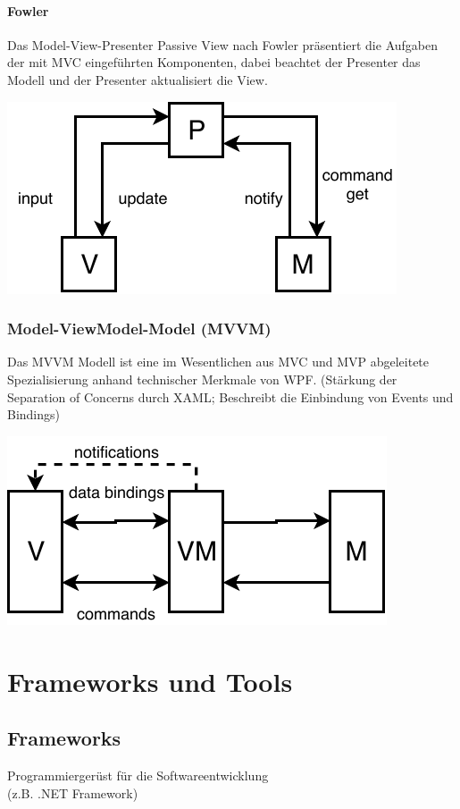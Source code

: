 \documentclass
[
	8pt,		%
	ngerman,	%
	a4paper,	%
	landscape,	%
	final		%
]{extarticle}
\begin{document}
\begin{multicols*}{4}
	\paragraph{Fowler}
	Das Model-View-Presenter Passive View nach Fowler präsentiert die Aufgaben
	der mit MVC eingeführten Komponenten, dabei beachtet der Presenter das Modell
	und der Presenter aktualisiert die View.
	\begin{center}
		\includegraphics[width=0.8\linewidth]{./Documents/Graphics/DiagramMVPFowler.pdf}
	\end{center}
	\subsubsection{Model-ViewModel-Model (MVVM)}
	Das MVVM Modell ist eine im Wesentlichen aus MVC und MVP abgeleitete
	Spezialisierung anhand technischer Merkmale von WPF.
	(Stärkung der Separation of Concerns durch XAML; Beschreibt die Einbindung
	von Events und Bindings)
	\begin{center}
		\includegraphics[width=0.8\linewidth]{./Documents/Graphics/DiagramMVVM.pdf}
	\end{center}
	\section{Frameworks und Tools}
	\subsection{Frameworks}
	Programmiergerüst für die Softwareentwicklung\\
	(z.B. .NET Framework)

\end{multicols*}
\end{document}
